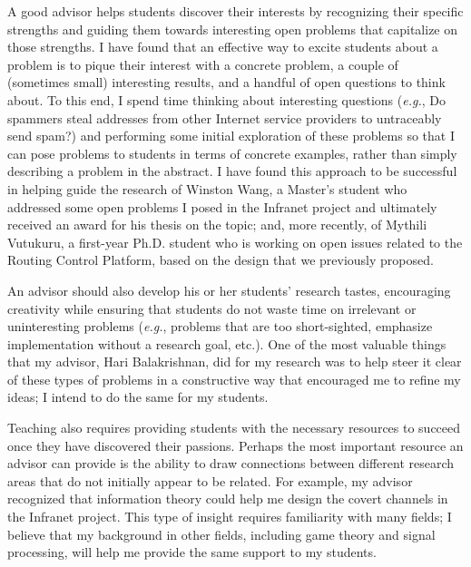\documentclass[11pt]{article}
\newcommand{\eg}{{\em e.g.}}
\begin{document}
A good advisor helps students discover their interests by recognizing
their specific strengths and guiding them towards interesting open
problems that capitalize on those strengths.  I have found that an
effective way to excite students about a problem is to pique their
interest with a concrete problem, a couple of (sometimes small)
interesting results, and a handful of open questions to think about.  To
this end, I spend time thinking about interesting questions (\eg, Do
spammers steal addresses from other Internet service providers to
untraceably send spam?) and 
performing some initial exploration of these problems so that I can pose
problems to students in terms of concrete examples, rather than simply
describing a problem in the abstract.  I have found this
approach to be successful in helping guide the research of
Winston Wang, a Master's student who addressed some open problems I
posed in the Infranet project and ultimately received an award for his
thesis on the topic; and, more recently, of Mythili Vutukuru, a
first-year Ph.D. student who is
working on open issues related to the Routing Control Platform, based
on the design that we previously proposed.

An advisor should also develop his or her students' research tastes,
encouraging creativity while ensuring that students do not waste time on
irrelevant or uninteresting problems (\eg, problems that are too
short-sighted, emphasize implementation without a research goal, etc.).
One of the 
most valuable things that my advisor, Hari Balakrishnan, did for my
research was to help steer it clear of these types of problems in a
constructive way that encouraged me to refine my ideas; I intend to do
the same for my students.

Teaching also requires providing students with the necessary resources
to succeed once they have discovered their passions.  Perhaps the most
important resource an advisor can provide is the ability to draw
connections between different research areas that do not initially
appear to be related.  For example, my advisor recognized that
information theory could help me design the covert channels in the
Infranet project.  This type of insight requires familiarity with many
fields; I believe that my background in other fields, including game
theory and signal processing, will help me provide the same support to
my students.
\end{document}
